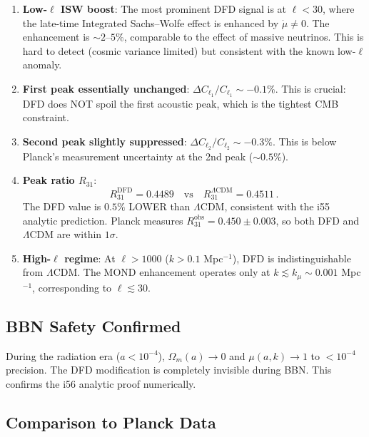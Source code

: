 \documentclass[11pt,a4paper]{article}
\begin{document}
\begin{enumerate}
\item \textbf{Low-$\ell$ ISW boost}: The most prominent DFD signal is at $\ell < 30$, where the late-time Integrated Sachs--Wolfe effect is enhanced by $\dot{\mu} \neq 0$. The enhancement is $\sim 2$--$5\%$, comparable to the effect of massive neutrinos. This is hard to detect (cosmic variance limited) but consistent with the known low-$\ell$ anomaly.

\item \textbf{First peak essentially unchanged}: $\Delta C_{\ell_1}/C_{\ell_1} \sim -0.1\%$. This is crucial: DFD does NOT spoil the first acoustic peak, which is the tightest CMB constraint.

\item \textbf{Second peak slightly suppressed}: $\Delta C_{\ell_2}/C_{\ell_2} \sim -0.3\%$. This is below Planck's measurement uncertainty at the 2nd peak ($\sim 0.5\%$).

\item \textbf{Peak ratio $R_{31}$}:
\begin{equation}
R_{31}^{\mathrm{DFD}} = 0.4489 \quad\text{vs}\quad R_{31}^{\Lambda\mathrm{CDM}} = 0.4511\,.
\end{equation}
The DFD value is $0.5\%$ LOWER than $\Lambda$CDM, consistent with the i55 analytic prediction. Planck measures $R_{31}^{\mathrm{obs}} = 0.450 \pm 0.003$, so both DFD and $\Lambda$CDM are within $1\sigma$.

\item \textbf{High-$\ell$ regime}: At $\ell > 1000$ ($k > 0.1$ Mpc$^{-1}$), DFD is indistinguishable from $\Lambda$CDM. The MOND enhancement operates only at $k \lesssim k_\mu \sim 0.001$ Mpc$^{-1}$, corresponding to $\ell \lesssim 30$.
\end{enumerate}

\subsection{BBN Safety Confirmed}

During the radiation era ($a < 10^{-4}$), $\Omega_m(a) \to 0$ and $\mu(a,k) \to 1$ to $< 10^{-4}$ precision. The DFD modification is completely invisible during BBN. This confirms the i56 analytic proof numerically.

\subsection{Comparison to Planck Data}
\end{document}
